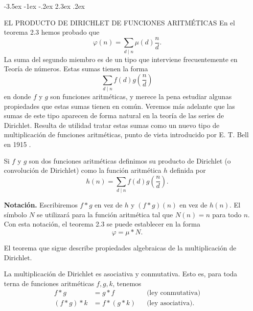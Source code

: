 \documentclass[12pt,a4paper]{book}
\makeatletter
\renewcommand\section{\@startsection{section}{1}{\z@}%
  {-3.5ex \@plus -1ex \@minus -.2ex}%
  {2.3ex \@plus .2ex}%
  {\normalfont\Large\bfseries\raggedright}}
\makeatother
\begin{document}
    \section{EL PRODUCTO DE DIRICHLET DE FUNCIONES ARITMÉTICAS}\label{sim:conv}
    En el teorema 2.3 hemos probado que
    \begin{equation*}
        \varphi(n)=\sum_{d\mid n}\mu(d)\frac{n}{d}.
    \end{equation*}
    La suma del segundo miembro es de un tipo que interviene frecuentemente en Teoría de
    números. Estas sumas tienen la forma
    \begin{equation*}
        \sum_{d\mid n}f(d)g\left(\frac{n}{d}\right)
    \end{equation*}
    en donde $f$ y $g$ son funciones aritméticas, y merece la pena estudiar algunas
    propiedades que estas sumas tienen en común. Veremos más adelante que las sumas de este
    tipo aparecen de forma natural en la teoría de las series de Dirichlet. Resulta de
    utilidad tratar estas sumas como un nuevo tipo de multiplicación de funciones
    aritméticas, punto de vista introducido por E. T. Bell en 1915 \cite{bell1915}.

    \begin{definicion}
        Si $f$ y $g$ son dos funciones aritméticas definimos su producto de Dirichlet (o
        convolución de Dirichlet) como la función aritmética $h$ definida por
        \begin{equation*}
            h(n)=\sum_{d\mid n}f(d)g\left(\frac{n}{d}\right).
        \end{equation*}
    \end{definicion}

    \textbf{Notación.} Escribiremos $f*g$ en vez de $h$ y $(f*g)(n)$ en vez de $h(n)$. El
    símbolo $N$ se utilizará para la función aritmética tal que $N(n)=n$ para todo $n$. Con
    esta notación, el teorema 2.3 se puede establecer en la forma
    \begin{equation*}
        \varphi=\mu*N.
    \end{equation*}

    El teorema que sigue describe propiedades algebraicas de la multiplicación de
    Dirichlet.

    \begin{teorema}
        La multiplicación de Dirichlet es asociativa y conmutativa. Esto es, para toda
        terna de funciones aritméticas $f,g,k$, tenemos
        \begin{align*}
            f*g&=g*f &&\text{(ley conmutativa)}\\
            (f*g)*k&=f*(g*k) &&\text{(ley asociativa).}
        \end{align*}
    \end{teorema}
\end{document}
